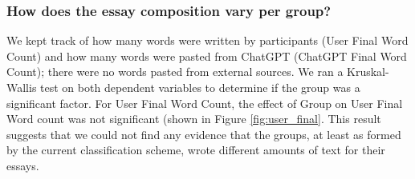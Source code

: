 \documentclass[manuscript,screen,acmsmall]{acmart}
\begin{document}
    

\subsubsection{How does the essay composition vary per group?}

We kept track of how many words were written by participants (User Final Word Count) and how many words were pasted from ChatGPT (ChatGPT Final Word Count); there were no words pasted from external sources. We ran a Kruskal-Wallis test on both dependent variables to determine if the group was a significant factor. For User Final Word Count, the effect of Group on User Final Word count was not significant (shown in Figure \ref{fig:user_final}. This result suggests that we could not find any evidence that the groups, at least as formed by the current classification scheme, wrote different amounts of text for their essays.
\end{document}
